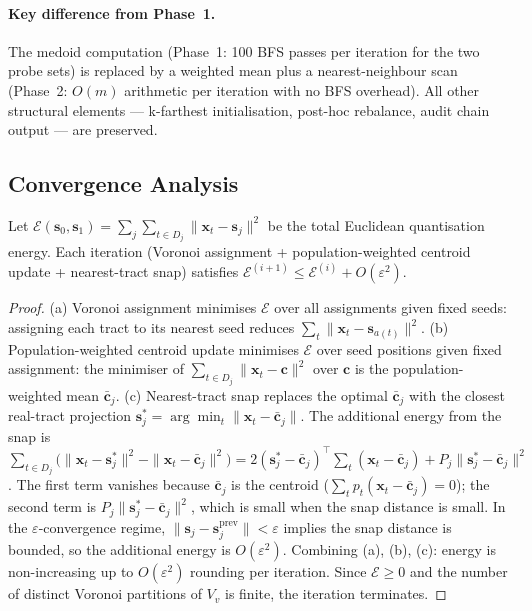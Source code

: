 \paragraph{Key difference from Phase~1.}
The medoid computation (Phase~1: 100 BFS passes per iteration for the two
probe sets) is replaced by a weighted mean plus a nearest-neighbour scan
(Phase~2: $O(m)$ arithmetic per iteration with no BFS overhead).
All other structural elements --- k-farthest initialisation,
post-hoc rebalance, audit chain output --- are preserved.

\subsection{Convergence Analysis}

\begin{proposition}
\label{prop:geo-convergence}
Let $\mathcal{E}(\mathbf{s}_0, \mathbf{s}_1)
= \sum_{j} \sum_{t \in D_j} \|\mathbf{x}_t - \mathbf{s}_j\|^2$
be the total Euclidean quantisation energy.
Each iteration (Voronoi assignment + population-weighted centroid update +
nearest-tract snap) satisfies
$\mathcal{E}^{(i+1)} \le \mathcal{E}^{(i)} + O(\varepsilon^2)$.
\end{proposition}

\begin{proof}
(a) Voronoi assignment minimises $\mathcal{E}$ over all assignments given
    fixed seeds: assigning each tract to its nearest seed reduces
    $\sum_t \|\mathbf{x}_t - \mathbf{s}_{a(t)}\|^2$.
(b) Population-weighted centroid update minimises $\mathcal{E}$ over
    seed positions given fixed assignment: the minimiser of
    $\sum_{t \in D_j}\|\mathbf{x}_t - \mathbf{c}\|^2$ over $\mathbf{c}$ is the
    population-weighted mean $\bar{\mathbf{c}}_j$.
(c) Nearest-tract snap replaces the optimal $\bar{\mathbf{c}}_j$ with the closest
    real-tract projection $\mathbf{s}_j^* = \arg\min_{t}\|\mathbf{x}_t - \bar{\mathbf{c}}_j\|$.
    The additional energy from the snap is
    $\sum_{t \in D_j}\bigl(\|\mathbf{x}_t - \mathbf{s}_j^*\|^2 - \|\mathbf{x}_t - \bar{\mathbf{c}}_j\|^2\bigr)
    = 2(\mathbf{s}_j^* - \bar{\mathbf{c}}_j)^\top \sum_{t}(\mathbf{x}_t - \bar{\mathbf{c}}_j)
    + P_j\|\mathbf{s}_j^* - \bar{\mathbf{c}}_j\|^2$.
    The first term vanishes because $\bar{\mathbf{c}}_j$ is the centroid
    ($\sum_t p_t(\mathbf{x}_t - \bar{\mathbf{c}}_j) = 0$); the second term
    is $P_j\|\mathbf{s}_j^* - \bar{\mathbf{c}}_j\|^2$, which is small when the snap
    distance is small.
    In the $\varepsilon$-convergence regime, $\|\mathbf{s}_j - \mathbf{s}_j^{\mathrm{prev}}\| < \varepsilon$
    implies the snap distance is bounded, so the additional energy is $O(\varepsilon^2)$.
Combining (a), (b), (c): energy is non-increasing up to $O(\varepsilon^2)$
rounding per iteration.
Since $\mathcal{E} \ge 0$ and the number of distinct Voronoi partitions of
$V_v$ is finite, the iteration terminates.
\end{proof}

